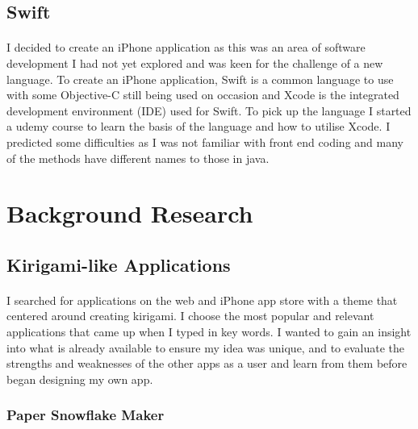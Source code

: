 \documentclass[11pt]{article}
\begin{document}
                  \subsection{Swift}
               
                \paragraph{} 
                    I decided to create an iPhone application as this was an area of software development I had not yet explored and was keen for the challenge of a new language. To create an iPhone application, Swift is a common language to use with some Objective-C still being used on occasion and Xcode is the integrated development environment (IDE) used for Swift. To pick up the language I started a udemy course %
                    to learn the basis of the language and how to utilise Xcode. I predicted some difficulties as I was not familiar with front end coding and many of the methods have different names to those in java. 

\newpage
\section{Background Research}

        \subsection{Kirigami-like Applications}
           \paragraph{}
            I searched for applications on the web and iPhone app store with a theme that centered around creating kirigami. I choose the most popular and relevant applications that came up when I typed in key words. I wanted to gain an insight into what is already available to ensure my idea was unique, and to evaluate the strengths and weaknesses of the other apps as a user and learn from them before began designing my own app.
            
            \subsubsection{Paper Snowflake Maker}
            
\end{document}
